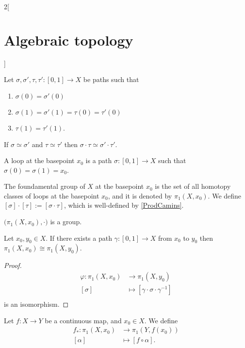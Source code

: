 \documentclass[../../../main_math.tex]{subfiles}
\begin{document}
\begin{multicols}{2}[\section{Algebraic topology}]
\begin{definition}
  \end{definition}

  \begin{lemma}\label{ProdCamins}
    Let $\sigma, \sigma', \tau, \tau':[0,1]\to X$ be paths such that
    \begin{enumerate}
      \item $\sigma(0)=\sigma'(0)$
      \item $\sigma(1)=\sigma'(1)=\tau(0)=\tau'(0)$
      \item $\tau(1)=\tau'(1)$.
    \end{enumerate}
    If $\sigma \simeq \sigma'$ and $\tau \simeq \tau'$ then $\sigma \cdot \tau \simeq \sigma' \cdot \tau'$.
  \end{lemma}

  \begin{definition}
    A loop at the basepoint $x_0$ is a path $\sigma: [0,1]\to X$ such that $\sigma(0)=\sigma(1)=x_0$.
  \end{definition}

  \begin{definition}
    The foundamental group of $X$ at the basepoint $x_0$ is the set of all homotopy classes of loops at the basepoint $x_0$, and it is denoted by $\pi_1 (X,x_0)$. We define $[\sigma]\cdot [\tau]:=[\sigma \cdot \tau]$, which is well-defined by \cref{ProdCamins}.
  \end{definition}

  \begin{proposition}
    $\big(\pi_1(X,x_0), \cdot \big)$ is a group.
  \end{proposition}

  \begin{proposition}
    Let $x_0, y_0 \in X$. If there exists a path $\gamma: [0,1] \to X$ from $x_0$ to $y_0$ then $\pi_1 (X,x_0) \cong \pi_1 (X,y_0)$.
  \end{proposition}

  \begin{proof}
    \begin{align*}
      \varphi: \pi_1(X,x_0) & \longrightarrow \pi_1(X,y_0)                        \\
      [\sigma]              & \longmapsto [\gamma \cdot \sigma \cdot \gamma^{-1}] \\
    \end{align*}
    is an isomorphism.
  \end{proof}

  \begin{definition}
    Let $f:X\to Y$ be a continuous map, and $x_0 \in X$. We define
    \begin{align*}
      f_*: \pi_1 (X,x_0) & \longrightarrow \pi_1 (Y,f(x_0)) \\
      [\alpha]           & \longmapsto [f\circ \alpha].
    \end{align*}


\end{definition}
\end{multicols}
\end{document}
